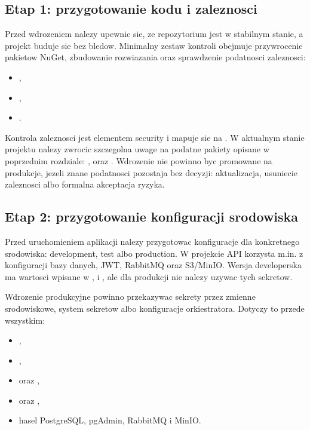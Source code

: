 \documentclass[12pt,a4paper]{article}
\begin{document}
\subsection{Etap 1: przygotowanie kodu i zaleznosci}

Przed wdrozeniem nalezy upewnic sie, ze repozytorium jest w stabilnym stanie, a projekt buduje sie bez bledow. Minimalny zestaw kontroli obejmuje przywrocenie pakietow NuGet, zbudowanie rozwiazania oraz sprawdzenie podatnosci zaleznosci:

\begin{itemize}
    \item {},
    \item {},
    \item {}.
\end{itemize}

Kontrola zaleznosci jest elementem security i mapuje sie na . W aktualnym stanie projektu nalezy zwrocic szczegolna uwage na podatne pakiety opisane w poprzednim rozdziale: ,  oraz . Wdrozenie nie powinno byc promowane na produkcje, jezeli znane podatnosci pozostaja bez decyzji: aktualizacja, usuniecie zaleznosci albo formalna akceptacja ryzyka.

\subsection{Etap 2: przygotowanie konfiguracji srodowiska}

Przed uruchomieniem aplikacji nalezy przygotowac konfiguracje dla konkretnego srodowiska: development, test albo production. W projekcie API korzysta m.in. z konfiguracji bazy danych, JWT, RabbitMQ oraz S3/MinIO. Wersja developerska ma wartosci wpisane w ,  i , ale dla produkcji nie nalezy uzywac tych sekretow.

Wdrozenie produkcyjne powinno przekazywac sekrety przez zmienne srodowiskowe, system sekretow albo konfiguracje orkiestratora. Dotyczy to przede wszystkim:

\begin{itemize}
    \item {},
    \item {},
    \item {} oraz ,
    \item {} oraz ,
    \item hasel PostgreSQL, pgAdmin, RabbitMQ i MinIO.
\end{itemize}
\end{document}
